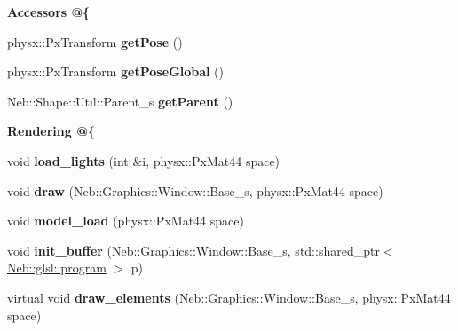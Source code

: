 \begin{Indent}{\bf \-Accessors @\{}\par
\begin{DoxyCompactItemize}
\item 
\hypertarget{classNeb_1_1Shape_1_1Base_ab3d11b90943d1de0783789dc1318b670}{physx\-::\-Px\-Transform {\bfseries get\-Pose} ()}\label{classNeb_1_1Shape_1_1Base_ab3d11b90943d1de0783789dc1318b670}

\item 
\hypertarget{classNeb_1_1Shape_1_1Base_a4580b58dbab5a9a126c9b73ff253b46d}{physx\-::\-Px\-Transform {\bfseries get\-Pose\-Global} ()}\label{classNeb_1_1Shape_1_1Base_a4580b58dbab5a9a126c9b73ff253b46d}

\item 
\hypertarget{classNeb_1_1Shape_1_1Base_a1553ed6727fc83a4350919f266e84720}{\-Neb\-::\-Shape\-::\-Util\-::\-Parent\-\_\-s {\bfseries get\-Parent} ()}\label{classNeb_1_1Shape_1_1Base_a1553ed6727fc83a4350919f266e84720}

\end{DoxyCompactItemize}
\end{Indent}
\begin{Indent}{\bf \-Rendering @\{}\par
\begin{DoxyCompactItemize}
\item 
\hypertarget{classNeb_1_1Shape_1_1Base_a6ead2ae23f4a40c548557d7f4ca0776a}{void {\bfseries load\-\_\-lights} (int \&i, physx\-::\-Px\-Mat44 space)}\label{classNeb_1_1Shape_1_1Base_a6ead2ae23f4a40c548557d7f4ca0776a}

\item 
\hypertarget{classNeb_1_1Shape_1_1Base_a4af3075465d25cfc80e5d482175d36a5}{void {\bfseries draw} (\-Neb\-::\-Graphics\-::\-Window\-::\-Base\-\_\-s, physx\-::\-Px\-Mat44 space)}\label{classNeb_1_1Shape_1_1Base_a4af3075465d25cfc80e5d482175d36a5}

\item 
\hypertarget{classNeb_1_1Shape_1_1Base_acf1c451755d1c444d561140984215b2e}{void {\bfseries model\-\_\-load} (physx\-::\-Px\-Mat44 space)}\label{classNeb_1_1Shape_1_1Base_acf1c451755d1c444d561140984215b2e}

\item 
\hypertarget{classNeb_1_1Shape_1_1Base_a5447e4b4946dc45eedca9397a317a92c}{void {\bfseries init\-\_\-buffer} (\-Neb\-::\-Graphics\-::\-Window\-::\-Base\-\_\-s, std\-::shared\-\_\-ptr$<$ \hyperlink{classNeb_1_1glsl_1_1program}{\-Neb\-::glsl\-::program} $>$ p)}\label{classNeb_1_1Shape_1_1Base_a5447e4b4946dc45eedca9397a317a92c}

\item 
\hypertarget{classNeb_1_1Shape_1_1Base_a782a3f9f80564ea65dca53dfd55042e9}{virtual void {\bfseries draw\-\_\-elements} (\-Neb\-::\-Graphics\-::\-Window\-::\-Base\-\_\-s, physx\-::\-Px\-Mat44 space)}\label{classNeb_1_1Shape_1_1Base_a782a3f9f80564ea65dca53dfd55042e9}

\end{DoxyCompactItemize}
\end{Indent}

